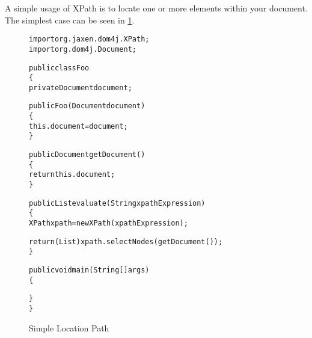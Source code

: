 \documentclass[10pt,twocolumn,letterpaper]{article}
\newenvironment{codelisting}%
	{\begin{minipage}{250pt}\small\begin{alltt}}%
	{\end{alltt}\end{minipage}}
\begin{document}
A simple usage of XPath is to locate one or more elements within
your document.  The simplest case can be seen in
\ref{location-path-example}.

\begin{figure}
\begin{codelisting}
import org.jaxen.dom4j.XPath;
import org.dom4j.Document;

public class Foo
\{
    private Document document;

    public Foo(Document document)
    \{
        this.document = document;
    \}

    public Document getDocument()
    \{
        return this.document;
    \}

    public List evaluate(String xpathExpression)
    \{
        XPath xpath = new XPath( xpathExpression );

        return (List) xpath.selectNodes( getDocument() );
    \}

    public void main(String[] args)
    \{
        
    \}
\}
\end{codelisting}
\label{location-path-example}
\caption{Simple Location Path}
\end{figure}


\end{document}
